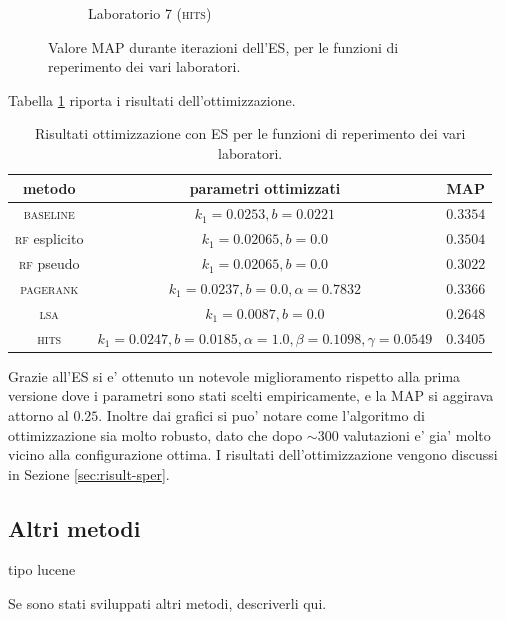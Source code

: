 \begin{figure}
\begin{subfigure}[htpb]{0.475\textwidth}
            \caption[]%
            {{\small Laboratorio 7 (\textsc{hits})}}    
            \label{fig:es_lab7}
        \end{subfigure}
        \caption[ The average and standard deviation of critical parameters ]
        {\small Valore MAP durante iterazioni dell'ES, per le funzioni di reperimento dei vari laboratori.} 
        \label{fig:es_all}
\end{figure}
Tabella \ref{tab:es} riporta i risultati dell'ottimizzazione.
\begin{table}[htpb]

\begin{center}
\begin{tabular}{|c|c|c|}
\hline
metodo & parametri ottimizzati & MAP \\
 \hline
\textsc{baseline} & $k_1 = 0.0253, b = 0.0221$ & $0.3354$ \\
\textsc{rf} esplicito & $k_1 = 0.02065, b = 0.0$ & $0.3504$ \\
\textsc{rf} pseudo & $k_1 = 0.02065, b = 0.0$ & $0.3022$ \\
\textsc{pagerank} & $k_1 = 0.0237, b = 0.0, \alpha=0.7832$ & $0.3366$ \\
\textsc{lsa} & $k_1 = 0.0087, b = 0.0$ & $0.2648$ \\
\textsc{hits} & $k_1 = 0.0247, b = 0.0185, \alpha=1.0, \beta=0.1098, \gamma=0.0549$ & $0.3405$ \\
\hline
\end{tabular}
\end{center}
\caption{Risultati ottimizzazione con ES per le funzioni di reperimento dei vari laboratori.}
\label{tab:es}
\end{table}

Grazie all'ES si e' ottenuto un notevole miglioramento rispetto alla prima versione dove i parametri sono stati scelti empiricamente, e la MAP si aggirava attorno al $0.25$. Inoltre dai grafici si puo' notare come l'algoritmo di ottimizzazione sia molto robusto, dato che dopo $\sim{300}$ valutazioni e' gia' molto vicino alla configurazione ottima. I risultati dell'ottimizzazione vengono discussi in Sezione \ref{sec:risult-sper}.

\subsection{Altri metodi}
tipo lucene
\label{sec:altri-metodi}

Se sono stati sviluppati altri metodi, descriverli qui.

